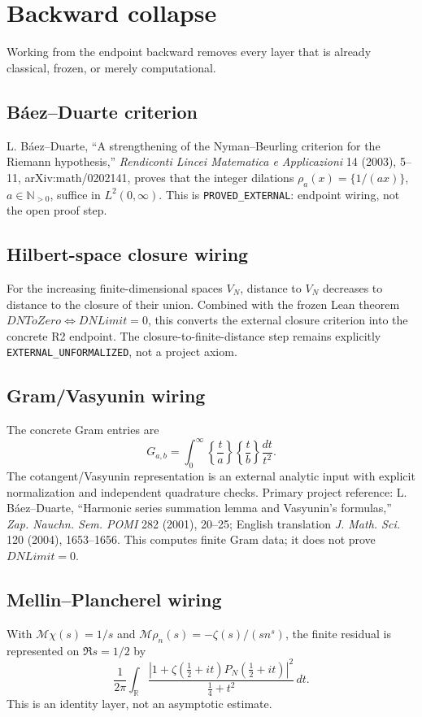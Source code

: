 \section{Backward collapse}
Working from the endpoint backward removes every layer that is already classical, frozen, or merely computational.

\subsection*{B\'aez--Duarte criterion}
L. B\'aez--Duarte, ``A strengthening of the Nyman--Beurling criterion for the Riemann hypothesis,'' \emph{Rendiconti Lincei Matematica e Applicazioni} 14 (2003), 5--11, arXiv:math/0202141, proves that the integer dilations $\rho_a(x)=\{1/(ax)\}$, $a\in\mathbb N_{>0}$, suffice in $L^2(0,\infty)$. This is \texttt{PROVED\_EXTERNAL}: endpoint wiring, not the open proof step.

\subsection*{Hilbert-space closure wiring}
For the increasing finite-dimensional spaces $V_N$, distance to $V_N$ decreases to distance to the closure of their union. Combined with the frozen Lean theorem $DNToZero\iff DNLimit=0$, this converts the external closure criterion into the concrete R2 endpoint. The closure-to-finite-distance step remains explicitly \texttt{EXTERNAL\_UNFORMALIZED}, not a project axiom.

\subsection*{Gram/Vasyunin wiring}
The concrete Gram entries are
\[
G_{a,b}=\int_0^\infty \left\{\frac{t}{a}\right\}\left\{\frac{t}{b}\right\}\frac{dt}{t^2}.
\]
The cotangent/Vasyunin representation is an external analytic input with explicit normalization and independent quadrature checks. Primary project reference: L. B\'aez--Duarte, ``Harmonic series summation lemma and Vasyunin's formulas,'' \emph{Zap. Nauchn. Sem. POMI} 282 (2001), 20--25; English translation \emph{J. Math. Sci.} 120 (2004), 1653--1656. This computes finite Gram data; it does not prove $DNLimit=0$.

\subsection*{Mellin--Plancherel wiring}
With $\mathcal M\chi(s)=1/s$ and $\mathcal M\rho_n(s)=-\zeta(s)/(s n^s)$, the finite residual is represented on $\Re s=1/2$ by
\[
\frac1{2\pi}\int_{\mathbb R}\frac{|1+\zeta(\tfrac12+it)P_N(\tfrac12+it)|^2}{\tfrac14+t^2}\,dt.
\]
This is an identity layer, not an asymptotic estimate.

